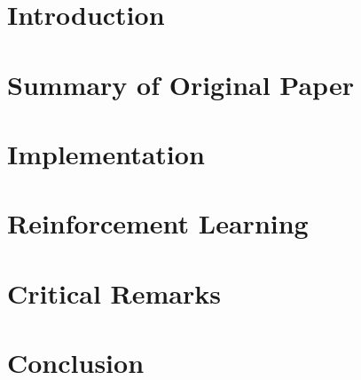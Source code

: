 




\section{Introduction}



\section{Summary of Original Paper}



\section{Implementation}




\clearpage
\section{Reinforcement Learning}






\section{Critical Remarks}



\clearpage
\section{Conclusion}

